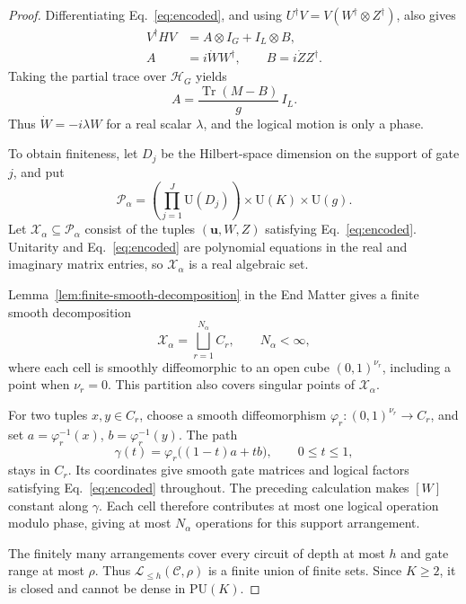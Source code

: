 \documentclass[aps,prl,reprint,notitlepage,nofootinbib,nobibnotes]{revtex4-2}
\newcommand{\HH}{\mathcal H}
\newcommand{\UU}{\mathrm U}
\newcommand{\PU}{\mathrm{PU}}
\newcommand{\id}{I}
\newcommand{\tr}{\operatorname{Tr}}
\begin{document}
\begin{proof}
Differentiating Eq.~\eqref{eq:encoded}, and using
\(U^\dagger V=V(W^\dagger\otimes Z^\dagger)\), also gives
\begin{align}
  V^\dagger H V&=A\otimes\id_G+\id_L\otimes B,
       \label{eq:logicalgen}\\
  A&=i\dot W W^\dagger,\qquad B=i\dot Z Z^\dagger.\nonumber
\end{align}
Taking the partial trace over \(\HH_G\) yields
\[
  A=\frac{\tr(M-B)}{g}\,\id_L.
\]
Thus \(\dot W=-i\lambda W\) for a real scalar \(\lambda\), and the logical
motion is only a phase.

To obtain finiteness, let \(D_j\) be the Hilbert-space dimension on the
support of gate \(j\), and put
\[
  \mathcal P_\alpha=
  \left(\prod_{j=1}^{J}\UU(D_j)\right)
    \times\UU(K)\times\UU(g).
\]
Let \(\mathcal X_\alpha\subseteq\mathcal P_\alpha\) consist of the tuples
\((\mathbf u,W,Z)\) satisfying Eq.~\eqref{eq:encoded}.
Unitarity and Eq.~\eqref{eq:encoded} are polynomial equations in the real
and imaginary matrix entries, so \(\mathcal X_\alpha\) is a real algebraic
set.

Lemma~\ref{lem:finite-smooth-decomposition} in the End Matter gives
a finite smooth decomposition
\begin{equation}\label{eq:cells}
  \mathcal X_\alpha=\bigsqcup_{r=1}^{N_\alpha}C_r,
  \qquad N_\alpha<\infty,
\end{equation}
where each cell is smoothly diffeomorphic to an open cube
\((0,1)^{\nu_r}\), including a point when \(\nu_r=0\).
This partition also covers singular points of \(\mathcal X_\alpha\).

For two tuples \(x,y\in C_r\), choose a smooth diffeomorphism
\(\varphi_r:(0,1)^{\nu_r}\to C_r\), and set
\(a=\varphi_r^{-1}(x)\), \(b=\varphi_r^{-1}(y)\).
The path
\begin{equation}\label{eq:cellpath}
  \gamma(t)=\varphi_r\bigl((1-t)a+tb\bigr),
  \qquad 0\le t\le1,
\end{equation}
stays in \(C_r\). Its coordinates give smooth gate matrices and logical
factors satisfying Eq.~\eqref{eq:encoded} throughout.
The preceding calculation makes \([W]\) constant along \(\gamma\).
Each cell therefore contributes at most one logical operation modulo
phase, giving at most \(N_\alpha\) operations for this support arrangement.

The finitely many arrangements cover every circuit of depth at most \(h\)
and gate range at most \(\rho\). Thus
\(\mathcal L_{\le h}(\mathcal C,\rho)\) is a finite union of finite sets.
Since \(K\ge2\), it is closed and cannot be dense in \(\PU(K)\).
\end{proof}
\end{document}
